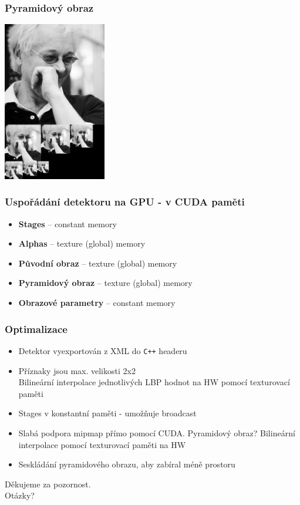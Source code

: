 \documentclass{beamer}
\begin{document}
	\begin{frame}[t,fragile]
		\frametitle{Pyramidový obraz}	
			
\centering\includegraphics[width=4.5cm]{img/pyramid.jpg}

								
	\end{frame}		
	
	
		\begin{frame}[t,fragile]
		\frametitle{Uspořádání detektoru na GPU - v CUDA paměti}
		\begin{itemize}
\item \textbf{Stages} – constant memory
\item \textbf{Alphas} – texture (global) memory
\item \textbf{Původní obraz} – texture (global) memory
\item \textbf{Pyramidový obraz} – texture (global) memory
\item \textbf{Obrazové parametry} – constant memory
\end{itemize}
		
	\end{frame}
	

	\begin{frame}[t,fragile]
		\frametitle{Optimalizace}					
		
		\begin{itemize}
			\item Detektor vyexportován z XML do \verb|C++| headeru
			\item Příznaky jsou max. velikosti 2x2 \\
				  Bilineární interpolace jednotlivých LBP hodnot na HW pomocí texturovací paměti
				  \item Stages v konstantní paměti - umožňuje broadcast
				  \item Slabá podpora mipmap přímo pomocí CUDA. Pyramidový obraz? Bilineární interpolace pomocí texturovací paměti na HW
				  \item Seskládání pyramidového obrazu, aby zabíral méně prostoru
		\end{itemize}

	\end{frame}
		
		
	\begin{frame}[t,fragile]

		\vspace{30mm}
\centering
\Huge Děkujeme za pozornost.\\ Otázky?
						
		
	\end{frame}

	
\end{document}
